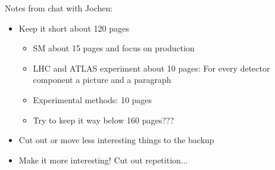 \clearpage



Notes from chat with Jochen:
\begin{itemize}

\item Keep it short \ra about 120 pages
  \begin{itemize}
  \item SM about 15 pages and focus on \HH production

  \item LHC and ATLAS experiment about 10 pages: For every detector
    component a picture and a paragraph

  \item Experimental methods: 10 pages

  \item Try to keep it way below 160 pages???
  \end{itemize}

\item Cut out or move less interesting things to the backup

\item Make it more interesting! Cut out repetition...

\end{itemize}


